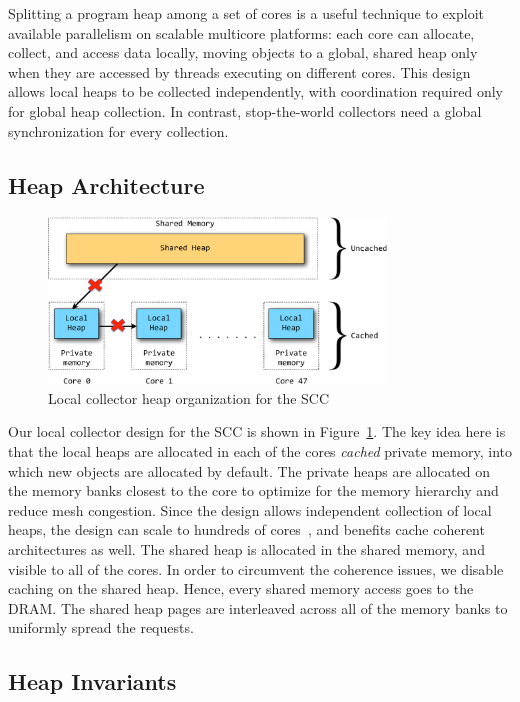 Splitting a program heap among a set of cores is a useful technique to exploit
available parallelism on scalable multicore platforms: each core can allocate,
collect, and access data locally, moving objects to a global, shared heap only
when they are accessed by threads executing on different cores. This design
allows local heaps to be collected independently, with coordination required
only for global heap collection. In contrast, stop-the-world collectors need a
global synchronization for every collection.

\subsection{Heap Architecture}

\begin{figure}[t]
\centering
\includegraphics[width=0.8\textwidth]{Figures/LocalCollector.pdf}
\caption{Local collector heap organization for the SCC}
\label{fig:lc}
\end{figure}


Our local collector design for the SCC is shown in Figure~\ref{fig:lc}. The key
idea here is that the local heaps are allocated in each of the cores
\emph{cached} private memory, into which new objects are allocated by default.
The private heaps are allocated on the memory banks closest to the core to
optimize for the memory hierarchy and reduce mesh congestion. Since the design
allows independent collection of local heaps, the design can scale to hundreds
of cores~\cite{JFP14}, and benefits cache coherent architectures as well. The
shared heap is allocated in the shared memory, and visible to all of the cores.
In order to circumvent the coherence issues, we disable caching on the shared
heap. Hence, every shared memory access goes to the DRAM. The shared heap pages
are interleaved across all of the memory banks to uniformly spread the
requests.

\subsection{Heap Invariants}

